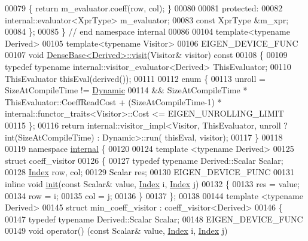 \begin{DoxyCode}
00079 \textcolor{keyword}{  }\{ \textcolor{keywordflow}{return} m\_evaluator.coeff(row, col); \}
00080   
00081 \textcolor{keyword}{protected}:
00082   internal::evaluator<XprType> m\_evaluator;
00083   \textcolor{keyword}{const} XprType &m\_xpr;
00084 \};
00085 \} \textcolor{comment}{// end namespace internal}
00086 
00104 \textcolor{keyword}{template}<\textcolor{keyword}{typename} Derived>
00105 \textcolor{keyword}{template}<\textcolor{keyword}{typename} Visitor>
00106 EIGEN\_DEVICE\_FUNC
00107 \textcolor{keywordtype}{void} \hyperlink{group___core___module_a7f73df3954a09c7ab0dca208b6b23ddd}{DenseBase<Derived>::visit}(Visitor& visitor)\textcolor{keyword}{ const}
00108 \textcolor{keyword}{}\{
00109   \textcolor{keyword}{typedef} \textcolor{keyword}{typename} internal::visitor\_evaluator<Derived> ThisEvaluator;
00110   ThisEvaluator thisEval(derived());
00111   
00112   \textcolor{keyword}{enum} \{
00113     unroll =  SizeAtCompileTime != \hyperlink{namespace_eigen_ad81fa7195215a0ce30017dfac309f0b2}{Dynamic}
00114            && SizeAtCompileTime * ThisEvaluator::CoeffReadCost + (SizeAtCompileTime-1) * 
      internal::functor\_traits<Visitor>::Cost <= EIGEN\_UNROLLING\_LIMIT
00115   \};
00116   \textcolor{keywordflow}{return} internal::visitor\_impl<Visitor, ThisEvaluator, unroll ? int(SizeAtCompileTime) : Dynamic>::run(
      thisEval, visitor);
00117 \}
00118 
00119 \textcolor{keyword}{namespace }\hyperlink{namespaceinternal}{internal} \{
00120 
00124 \textcolor{keyword}{template} <\textcolor{keyword}{typename} Derived>
00125 \textcolor{keyword}{struct }coeff\_visitor
00126 \{
00127   \textcolor{keyword}{typedef} \textcolor{keyword}{typename} Derived::Scalar Scalar;
00128   \hyperlink{namespace_eigen_a62e77e0933482dafde8fe197d9a2cfde}{Index} row, col;
00129   Scalar res;
00130   EIGEN\_DEVICE\_FUNC
00131   \textcolor{keyword}{inline} \textcolor{keywordtype}{void} \hyperlink{structinit}{init}(\textcolor{keyword}{const} Scalar& value, \hyperlink{namespace_eigen_a62e77e0933482dafde8fe197d9a2cfde}{Index} i, \hyperlink{namespace_eigen_a62e77e0933482dafde8fe197d9a2cfde}{Index} j)
00132   \{
00133     res = value;
00134     row = i;
00135     col = j;
00136   \}
00137 \};
00138 
00144 \textcolor{keyword}{template} <\textcolor{keyword}{typename} Derived>
00145 \textcolor{keyword}{struct }min\_coeff\_visitor : coeff\_visitor<Derived>
00146 \{
00147   \textcolor{keyword}{typedef} \textcolor{keyword}{typename} Derived::Scalar Scalar;
00148   EIGEN\_DEVICE\_FUNC
00149   \textcolor{keywordtype}{void} operator() (\textcolor{keyword}{const} Scalar& value, \hyperlink{namespace_eigen_a62e77e0933482dafde8fe197d9a2cfde}{Index} i, \hyperlink{namespace_eigen_a62e77e0933482dafde8fe197d9a2cfde}{Index} j)

\end{DoxyCode}
